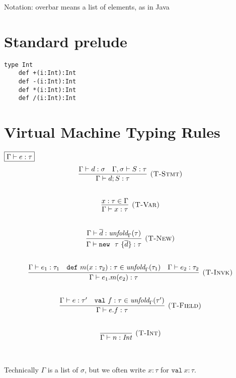 \documentclass{article}
\newcommand{\keywadj}[1]{\mathtt{#1}}
\newcommand{\keyw}[1]{\keywadj{#1}~}
\begin{document}
Notation: overbar means a list of elements, as in Java




\section{Standard prelude}

\begin{lstlisting}
type Int
    def +(i:Int):Int
    def -(i:Int):Int
    def *(i:Int):Int
    def /(i:Int):Int
\end{lstlisting}

\section{Virtual Machine Typing Rules}

$\fbox{$\Gamma \vdash e : \tau$}$
\[
\begin{array}{c}
\infer[\textsc{(T-Stmt)}]
  {\Gamma \vdash d; S : \tau}
  {\Gamma \vdash d : \sigma & \Gamma, \sigma \vdash S : \tau}\\[5ex]
  
\infer[\textsc{(T-Var)}]
  {\Gamma \vdash x : \tau}
  {x : \tau \in \Gamma}\\[5ex]

\infer[\textsc{(T-New)}]
	{\Gamma \vdash \keyw{new}~\tau~\{\overline{d}\} : \tau}
	{\Gamma \vdash \overline{d} : \textit{unfold}_\Gamma(\tau)} \\[5ex]

\infer[\textsc{(T-Invk)}]
	{\Gamma \vdash e_1.m(e_2) : \tau} 
	{\Gamma \vdash e_1 : \tau_1  & \keyw{def} m(x:\tau_2):\tau \in \textit{unfold}_\Gamma(\tau_1) & \Gamma \vdash e_2 : \tau_2}\\[5ex]

\infer[\textsc{(T-Field)}]
	{\Gamma \vdash e.f : \tau} 
	{\Gamma \vdash e : \tau' & \keyw{val} f : \tau \in \textit{unfold}_\Gamma(\tau')}\\[5ex]

\infer[\textsc{(T-Int)}]
  {\Gamma \vdash n : \textit{Int}}
  {}\\[5ex]

\end{array}
\]

Technically $\Gamma$ is a list of $\sigma$, but we often write $x:\tau$ for $\keyw{val} x:\tau$.
\end{document}
